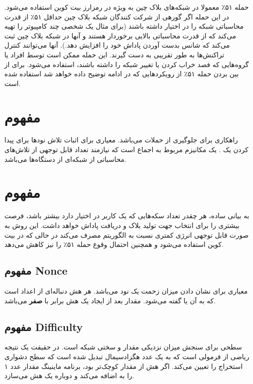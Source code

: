 \documentclass[10pt, a4paper]{article}
\begin{document}
حمله ۵۱٪ معمولا در شبکه‌های بلاک چین به ویژه در رمزارز بیت کوین استفاده می‌شود.
در این حمله اگر گورهی از شرکت کنندگان شبکه بلاک چین حداقل ۵۱٪ از قدرت محاسباتی
شبکه را در اختیار داشته باشند (برای مثال یک شخصی چند کامپیوتر را تهیه می‌کند که
از قدرت محاسباتی بالایی برخوردار هستند و آنها در شبکه بلاک چین ثبت می‌کند که
شانس بدست آوردن پاداش خود را افزایش دهد.). آنها می‌توانند کنترل تراکنش‌ها به طور
تقریبی به دست گیرند. این حمله ممکن است توسط افراد یا گروه‌هایی که فصد خراب کردن
یا تغییر شبکه را داشته باشند، استفاده می‌شود. برای از بین بردن حمله ۵۱٪ از
رویکرد‌هایی که در ادامه توضیح داده خواهد شد استفاده شده است.

\section{مفهوم }

راهکاری برای جلوگیری از حملات  می‌باشد. معیاری برای اثبات تلاش نود‌ها
برای پیدا کردن یک . یک مکانیزم مربوط به اجماع است که نیازمند تعداد
قابل توجهی از تلاش‌های محاسباتی از شبکه‌ای از دستگاه‌ها می‌باشد.

\section{مفهوم }

به بیانی ساده، هر چقدر تعداد سکه‌هایی که یک کاربر در اختیار دارد بیشتر باشد،
فرصت بیشتری را برای انتخاب جهت تولید بلاک و دریافت پاداش خواهد داشت. این روش به
صورت قابل توجهی انرژی کمتری نسبت به الگوریتم  مصرف می‌کند در حالی که در
بیت کوین استفاده می‌شود و همچنین احتمال وقوع حمله ۵۱٪ را نیز کاهش می‌دهد.

\subsection{مفهوم Nonce}

معیاری برای نشان دادن میزان زحمت یک نود می‌باشد. هر هش دنباله‌ای از اعداد است که
به آن  یا  گفته می‌شود. مقدار  بعد از
ایجاد یک هش برابر با \textbf{صفر} می‌باشد.

\subsection{مفهوم Difficulty}

سطحی برای سنجش میزان نزدیکی مقدار  و سختی شبکه است. در حقیقت یک نتیجه
ریاضی از فرمولی است که به یک عدد هگزادسیمال تبدیل شده است که سطح دشواری استخراج
را تعیین می‌کند. اگر هش از مقدار  کوچک‌تر بود، برنامه ماینینگ
مقدار عدد ۱ را به  اضافه می‌کند و دوباره یک هش می‌سازد.
\end{document}
